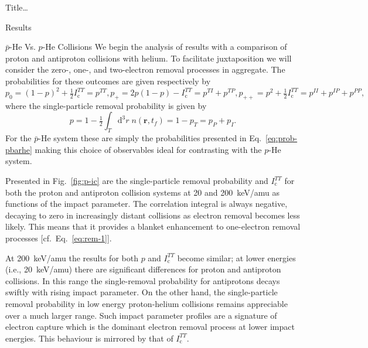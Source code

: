 \documentclass[letterpaper, 11 pt]{report}
\begin{document}
\begin{chapter}{ Title\dots \label{chap:p-he2p-he}}
\begin{section}{Results \label{sec:phe2p-res}}
\begin{subsection}{ \texorpdfstring{$\bar{p}$}{pbar}-He Vs. \texorpdfstring{$p$}{p}-He Collisions
                         \label{sec:pbarhe-res}}
         We begin the analysis of results with a comparison of proton and antiproton collisions with
         helium. To facilitate juxtaposition we will consider the zero-, one-, and two-electron removal
         processes in aggregate. The probabilities for these outcomes are given respectively by
         \begin{subequations} \label{eq:remove}
            \begin{equation} \label{eq:rem-0}
               p_0 = (1 - p)^2 + \tfrac{1}{2} I^{TT}_\mathrm{c} = p^{TT},
            \end{equation}
            \begin{equation} \label{eq:rem-1}
               p_+ = 2 p (1-p) - I^{TT}_\mathrm{c} = p^{TI} + p^{TP},
            \end{equation}
            \begin{equation} \label{eq:rem-2}
               p_{++} = p^2 + \tfrac{1}{2} I^{TT}_\mathrm{c} = p^{II} + p^{IP} + p^{PP},
            \end{equation}
         \end{subequations}
         where the single-particle removal probability is given by
         \begin{equation} \label{eq:p-rem}
            p = 1 - \tfrac{1}{2} \int_T \mathrm{d}^3 r \; n(\mathbf{r},t_f)
            = 1 - p_T = p_P + p_I.
         \end{equation}
         For the $\bar{p}$-He system these are simply the probabilities presented in
         Eq.~\eqref{eq:prob-pbarhe} making this choice of observables ideal for contrasting with the
         $p$-He system.

         Presented in Fig.~\ref{fig:p-ic} are the single-particle removal probability and
         $I^{TT}_\mathrm{c}$ for both the proton and antiproton collision systems at 20 and 200~keV/amu
         as functions of the impact parameter. The correlation integral is always negative, decaying to
         zero in increasingly distant collisions as electron removal becomes less likely. This means
         that it provides a blanket enhancement to one-electron removal processes
         [cf.\ Eq.~\eqref{eq:rem-1}]. 

         At 200~keV/amu the results for both $p$ and $I^{TT}_\mathrm{c}$ become similar; at lower
         energies (i.e., 20~keV/amu) there are significant differences for proton and antiproton
         collisions. In this range the single-removal probability for antiprotons decays swiftly with
         rising impact parameter. On the other hand, the single-particle removal probability in low
         energy proton-helium collisions remains appreciable over a much larger range. Such impact
         parameter profiles are a signature of electron capture which is the dominant electron removal
         process at lower impact energies. This behaviour is mirrored by that of $I^{TT}_\mathrm{c}$.


\end{subsection}
\end{section}
\end{chapter}
\end{document}
